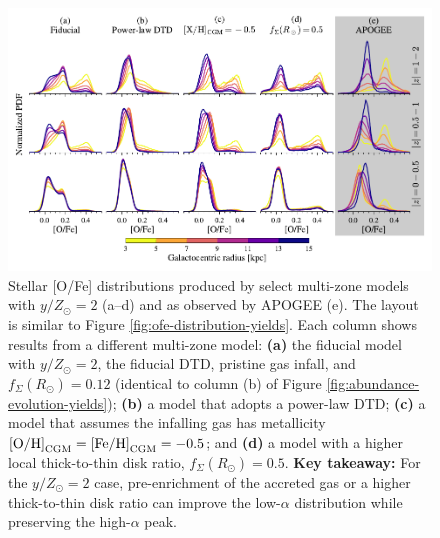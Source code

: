 \documentclass[twocolumn,twocolappendix,linenumbers]{aastex631}
\newcommand{\mathOH}{{\rm [O/H]}}
\newcommand{\mathFeH}{{\rm [Fe/H]}}
\newcommand{\yZ}[1]{$y/Z_\odot=#1$}
\begin{document}
\begin{figure}
    \centering
    \includegraphics[width=\linewidth]{src/tex/figures/ofe_distribution_params.pdf}
    \caption{Stellar [O/Fe] distributions produced by select multi-zone models with \yZ{2} (a--d) and as observed by APOGEE (e). The layout is similar to Figure \ref{fig:ofe-distribution-yields}. Each column shows results from a different multi-zone model: {\bf (a)} the fiducial model with \yZ{2}, the fiducial DTD, pristine gas infall, and $f_\Sigma(R_\odot)=0.12$ (identical to column (b) of Figure \ref{fig:abundance-evolution-yields}); {\bf (b)} a model that adopts a power-law DTD; {\bf (c)} a model that assumes the infalling gas has metallicity $\mathOH_{\rm CGM}=\mathFeH_{\rm CGM}=-0.5$; and {\bf (d)} a model with a higher local thick-to-thin disk ratio, $f_\Sigma(R_\odot)=0.5$. {\bf Key takeaway:} For the \yZ{2} case, pre-enrichment of the accreted gas or a higher thick-to-thin disk ratio can improve the low-$\alpha$ distribution while preserving the high-$\alpha$ peak.}
    \label{fig:ofe-distribution-parameters}
\end{figure}
\end{document}
